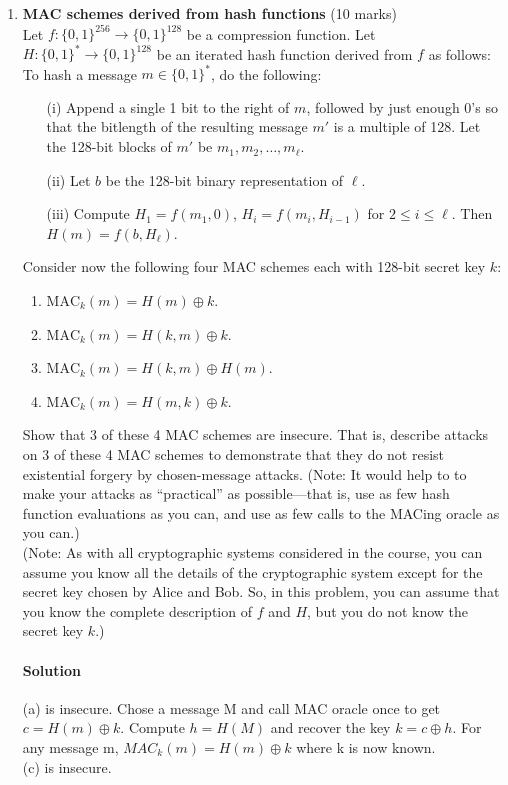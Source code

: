 \documentclass[11pt]{article}
\begin{document}
\begin{enumerate}
\item {\bf MAC schemes derived from hash functions} (10 marks)\\
Let $f : \{0,1\}^{256} \rightarrow \{0,1\}^{128}$ be a compression function.
Let $H : \{0,1\}^* \rightarrow \{0,1\}^{128}$ be an iterated hash function
derived from $f$ as follows: To hash a message $m \in \{0,1\}^*$, do the
following:
\begin{itemize}
\item[(i)] Append a single 1 bit to the right of $m$, followed by just
      enough $0$'s so that the bitlength of the resulting message $m'$
      is a multiple of 128. Let the 128-bit blocks of $m'$ be
      $m_1, m_2, \ldots, m_{\ell}$.
\item[(ii)] Let $b$ be the 128-bit binary representation of $\ell$.
\item[(iii)] Compute $H_1 = f(m_1,0)$, $H_i = f(m_i,H_{i-1})$ for
             $2 \leq i \leq \ell$. Then $H(m) = f(b,H_\ell)$.
\end{itemize}
Consider now the following four MAC schemes each with 128-bit secret key
$k$:
\begin{enumerate}
\item $\mbox{MAC}_k(m) = H(m) \oplus k$.
\item $\mbox{MAC}_k(m) = H(k,m) \oplus k$.
\item $\mbox{MAC}_k(m) = H(k,m) \oplus H(m)$.
\item $\mbox{MAC}_k(m) = H(m,k) \oplus k$.
\end{enumerate}
Show that 3 of these 4 MAC schemes are insecure. That is, describe
attacks on 3 of these 4 MAC schemes to demonstrate that they do not resist
existential forgery by chosen-message attacks. (Note: It would help to
to make your attacks as ``practical'' as possible---that is, use as
few hash function evaluations as you can, and use as few calls to the
MACing oracle as you can.)\\
(Note: As with all cryptographic systems considered in the course, you
can assume you know all the details of the cryptographic system except
for the secret key chosen by Alice and Bob. So, in this problem, you
can assume that you know the complete description of $f$ and $H$, but
you do not know the secret key $k$.)
\paragraph{Solution} 
(a) is insecure. Chose a message M and call MAC oracle once to get $c=H(m)\oplus k$. Compute $h=H(M)$ and recover the key $k=c\oplus h$. For any message m, $MAC_k(m)=H(m)\oplus k$ where k is now known.\\
(c) is insecure.


\end{enumerate}
\end{document}
